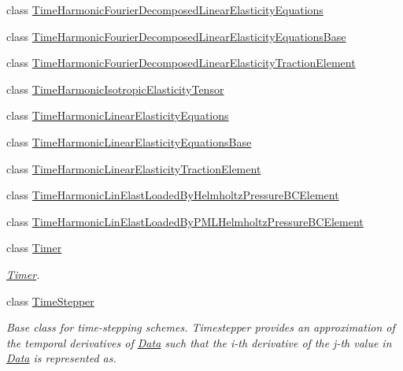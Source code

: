 \begin{DoxyCompactItemize}
\item 
class \hyperlink{classoomph_1_1TimeHarmonicFourierDecomposedLinearElasticityEquations}{Time\+Harmonic\+Fourier\+Decomposed\+Linear\+Elasticity\+Equations}
\item 
class \hyperlink{classoomph_1_1TimeHarmonicFourierDecomposedLinearElasticityEquationsBase}{Time\+Harmonic\+Fourier\+Decomposed\+Linear\+Elasticity\+Equations\+Base}
\item 
class \hyperlink{classoomph_1_1TimeHarmonicFourierDecomposedLinearElasticityTractionElement}{Time\+Harmonic\+Fourier\+Decomposed\+Linear\+Elasticity\+Traction\+Element}
\item 
class \hyperlink{classoomph_1_1TimeHarmonicIsotropicElasticityTensor}{Time\+Harmonic\+Isotropic\+Elasticity\+Tensor}
\item 
class \hyperlink{classoomph_1_1TimeHarmonicLinearElasticityEquations}{Time\+Harmonic\+Linear\+Elasticity\+Equations}
\item 
class \hyperlink{classoomph_1_1TimeHarmonicLinearElasticityEquationsBase}{Time\+Harmonic\+Linear\+Elasticity\+Equations\+Base}
\item 
class \hyperlink{classoomph_1_1TimeHarmonicLinearElasticityTractionElement}{Time\+Harmonic\+Linear\+Elasticity\+Traction\+Element}
\item 
class \hyperlink{classoomph_1_1TimeHarmonicLinElastLoadedByHelmholtzPressureBCElement}{Time\+Harmonic\+Lin\+Elast\+Loaded\+By\+Helmholtz\+Pressure\+B\+C\+Element}
\item 
class \hyperlink{classoomph_1_1TimeHarmonicLinElastLoadedByPMLHelmholtzPressureBCElement}{Time\+Harmonic\+Lin\+Elast\+Loaded\+By\+P\+M\+L\+Helmholtz\+Pressure\+B\+C\+Element}
\item 
class \hyperlink{classoomph_1_1Timer}{Timer}
\begin{DoxyCompactList}\small\item\em \hyperlink{classoomph_1_1Timer}{Timer}. \end{DoxyCompactList}\item 
class \hyperlink{classoomph_1_1TimeStepper}{Time\+Stepper}
\begin{DoxyCompactList}\small\item\em Base class for time-\/stepping schemes. Timestepper provides an approximation of the temporal derivatives of \hyperlink{classoomph_1_1Data}{Data} such that the i-\/th derivative of the j-\/th value in \hyperlink{classoomph_1_1Data}{Data} is represented as. \end{DoxyCompactList}\item 

\end{DoxyCompactItemize}
